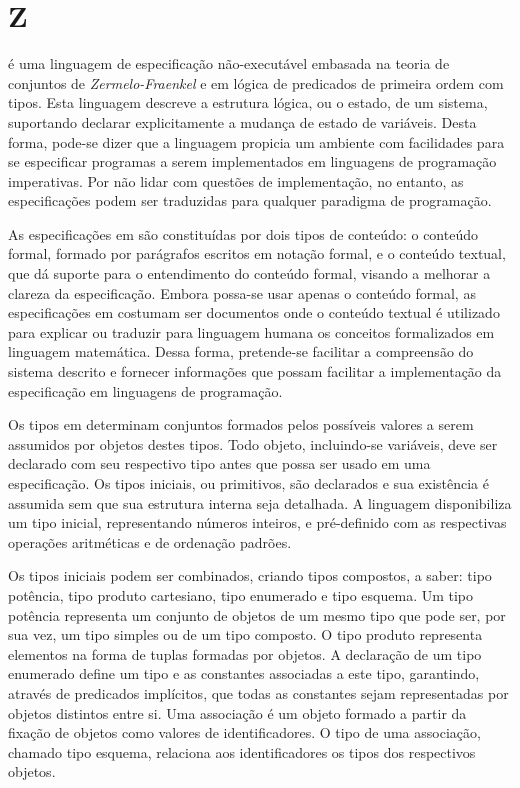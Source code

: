 \section{Z}\label{chap:revisaobib:z}
\Z \cite{ZMoura,ZNotation} é uma linguagem de especificação não-executável embasada na teoria de conjuntos de \textit{Zermelo-Fraenkel} e em lógica de predicados de primeira ordem com tipos.
Esta linguagem descreve a estrutura lógica, ou o estado, de um sistema, suportando declarar explicitamente a mudança de estado de variáveis.
Desta forma, pode-se dizer que a linguagem propicia um ambiente com facilidades para se especificar programas a serem implementados em linguagens de programação imperativas.
Por não lidar com questões de implementação, no entanto, as especificações podem ser traduzidas para qualquer paradigma de programação.

As especificações em \Z são constituídas por dois tipos de conteúdo: o conteúdo formal, formado por parágrafos escritos em notação formal, e o conteúdo textual, que dá suporte para o entendimento do conteúdo formal, visando a melhorar a clareza da especificação.
Embora possa-se usar apenas o conteúdo formal, as especificações em \Z costumam ser documentos onde o conteúdo textual é utilizado para explicar ou traduzir para linguagem humana os conceitos formalizados em linguagem matemática.
Dessa forma, pretende-se facilitar a compreensão do sistema descrito e fornecer informações que possam facilitar a implementação da especificação em linguagens de programação.

Os tipos em \Z determinam conjuntos formados pelos possíveis valores a serem assumidos por objetos destes tipos.
Todo objeto, incluindo-se variáveis, deve ser declarado com seu respectivo tipo antes que possa ser usado em uma especificação.
Os tipos iniciais, ou primitivos, são declarados e sua existência é assumida sem que sua estrutura interna seja detalhada.
A linguagem disponibiliza um tipo inicial, representando números inteiros, e pré-definido com as respectivas operações aritméticas e de ordenação padrões.

Os tipos iniciais podem ser combinados, criando tipos compostos, a saber: tipo potência, tipo produto cartesiano, tipo enumerado e tipo esquema.
Um tipo potência representa um conjunto de objetos de um mesmo tipo que pode ser, por sua vez, um tipo simples ou de um tipo composto.
O tipo produto representa elementos na forma de tuplas formadas por objetos.
A declaração de um tipo enumerado define um tipo e as constantes associadas a este tipo, garantindo, através de predicados implícitos, que todas as constantes sejam representadas por objetos distintos entre si.
Uma associação é um objeto formado a partir da fixação de objetos como valores de identificadores.
O tipo de uma associação, chamado tipo esquema, relaciona aos identificadores os tipos dos respectivos objetos.

